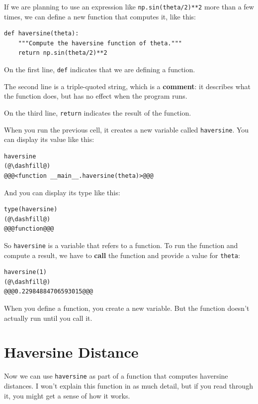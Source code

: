 If we are planning to use an expression like
\passthrough{\lstinline!np.sin(theta/2)**2!} more than a few times, we
can define a new function that computes it, like this:

\begin{lstlisting}[]
def haversine(theta):
    """Compute the haversine function of theta."""
    return np.sin(theta/2)**2
\end{lstlisting}

On the first line, \passthrough{\lstinline!def!} indicates that we are
defining a function.

The second line is a triple-quoted string, which is a \textbf{comment}:
it describes what the function does, but has no effect when the program
runs.

On the third line, \passthrough{\lstinline!return!} indicates the result
of the function.

When you run the previous cell, it creates a new variable called
\passthrough{\lstinline!haversine!}. You can display its value like
this:

\begin{lstlisting}[]
haversine
(@\dashfill@)
@@@<function __main__.haversine(theta)>@@@
\end{lstlisting}

And you can display its type like this:

\begin{lstlisting}[]
type(haversine)
(@\dashfill@)
@@@function@@@
\end{lstlisting}

So \passthrough{\lstinline!haversine!} is a variable that refers to a
function. To run the function and compute a result, we have to
\textbf{call} the function and provide a value for
\passthrough{\lstinline!theta!}:

\begin{lstlisting}[]
haversine(1)
(@\dashfill@)
@@@0.22984884706593015@@@
\end{lstlisting}

When you define a function, you create a new variable. But the function
doesn't actually run until you call it.

\hypertarget{haversine-distance}{%
\section{Haversine Distance}\label{haversine-distance}}

Now we can use \passthrough{\lstinline!haversine!} as part of a function
that computes haversine distances. I won't explain this function in as
much detail, but if you read through it, you might get a sense of how it
works.

